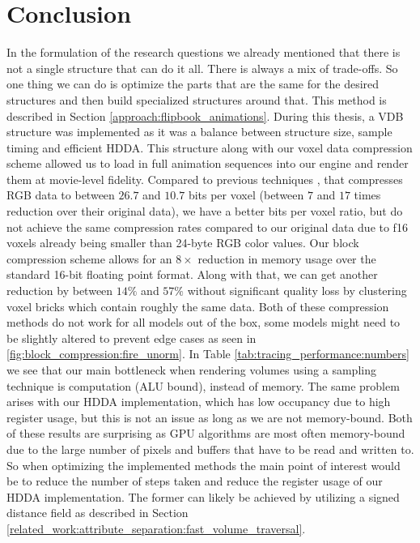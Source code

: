 \section{Conclusion} \label{conclusion}
In the formulation of the research questions we already mentioned that there is not a single structure that can do it all. There is always a mix of trade-offs. So one thing we can do is optimize the parts that are the same for the desired structures and then build specialized structures around that. This method is described in Section \ref{approach:flipbook_animations}. During this thesis, a VDB structure was implemented as it was a balance between structure size, sample timing and efficient HDDA. This structure along with our voxel data compression scheme allowed us to load in full animation sequences into our engine and render them at movie-level fidelity. Compared to previous techniques \cite{dolonius2017compressing}, that compresses RGB data to between $26.7$ and $10.7$ bits per voxel (between $7$ and $17$ times reduction over their original data), we have a better bits per voxel ratio, but do not achieve the same compression rates compared to our original data due to f16 voxels already being smaller than 24-byte RGB color values. Our block compression scheme allows for an $8\times$ reduction in memory usage over the standard 16-bit floating point format. Along with that, we can get another reduction by between $14\%$ and $57\%$ without significant quality loss by clustering voxel bricks which contain roughly the same data. Both of these compression methods do not work for all models out of the box, some models might need to be slightly altered to prevent edge cases as seen in \ref{fig:block_compression:fire_unorm}. In Table \ref{tab:tracing_performance:numbers} we see that our main bottleneck when rendering volumes using a sampling technique is computation (ALU bound), instead of memory. The same problem arises with our HDDA implementation, which has low occupancy due to high register usage, but this is not an issue as long as we are not memory-bound. Both of these results are surprising as GPU algorithms are most often memory-bound due to the large number of pixels and buffers that have to be read and written to. So when optimizing the implemented methods the main point of interest would be to reduce the number of steps taken and reduce the register usage of our HDDA implementation. The former can likely be achieved by utilizing a signed distance field as described in Section \ref{related_work:attribute_separation:fast_volume_traversal}.

